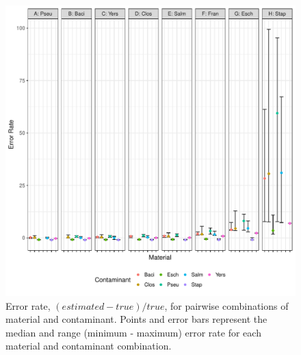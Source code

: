 \documentclass[fleqn,10pt,lineno]{wlpeerj}\usepackage[]{graphicx}\usepackage[]{color}
\makeatletter
\def\maxwidth{ %
  \ifdim\Gin@nat@width>\linewidth
    \linewidth
  \else
    \Gin@nat@width
  \fi
}
\newenvironment{knitrout}{}{} %
\makeatother
\begin{document}
\begin{knitrout}
\color{fgcolor}\begin{figure}
\includegraphics[width=\maxwidth]{figure/contam_resid-1} \caption[Error rate, $(estimated - true)/true$, for pairwise combinations of material and contaminant]{Error rate, $(estimated - true)/true$, for pairwise combinations of material and contaminant. Points and error bars represent the median and range (minimum - maximum) error rate for each material and contaminant combination.}\label{fig:contam_resid}
\end{figure}


\end{knitrout}
\end{document}
